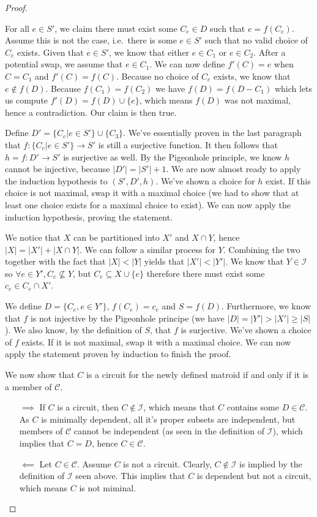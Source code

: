 \begin{proof}
\begin{enumerate}
\begin{enumerate}
            For all $e \in S'$, we claim there must exist some $C_e \in D$ such that $e = f(C_e)$. Assume this is not the case, i.e.\ there is some $e \in S'$ such that no valid choice of $C_e$ exists. Given that $e \in S'$, we know that either $e \in C_1$ or $e \in C_2$. After a potential swap, we assume that $e \in C_1$. We can now define $f'(C) = e$ when $C = C_1$ and $f'(C) = f(C)$. Because no choice of $C_e$ exists, we know that $e \not\in f(D)$. Because $f(C _1 ) = f(C _2 )$ we have $f(D) = f(D - C _1 )$ which lets us compute $f'(D) = f(D) \cup \{e\}$, which means $f(D)$ was not maximal, hence a contradiction. Our claim is then true.

            Define $D' = \{C_e | e \in S'\} \cup \{C _3 \}$. We've essentially proven in the last paragraph that $f : \{C_e | e \in S'\} \to S'$ is still a  surjective function. It then follows that $h = f : D' \to S'$ is surjective as well. By the Pigeonhole principle, we know $h$ cannot be injective, because $|D'| = |S'| + 1$. We are now almost ready to apply the induction hypothesis to $(S', D', h)$. We've shown a choice for $h$ exist. If this choice is not maximal, swap it with a maximal choice (we had to show that at least one choice exists for a maximal choice to exist). We can now apply the induction hypothesis, proving the statement.
    \end{enumerate}

    We notice that $X$ can be partitioned into $X'$ and $X \cap Y$, hence $|X| = |X'| + |X \cap Y|$. We can follow a similar process for $Y$. Combining the two together with the fact that $|X| < |Y|$ yields that $|X'| < |Y'|$. We know that $Y \in \mathcal I$ so $\forall e \in Y', C_e \not \subseteq  Y$, but $C_e \subseteq  X \cup \{e\}$ therefore there must exist some $c_e \in C_e \cap X'$. 

    We define $D = \{C_e, e \in Y'\}$, $f(C_e) = c_e$ and $S = f(D)$. Furthermore, we know that $f$ is not injective by the Pigeonhole principe (we have $|D| = |Y'| > |X'| \geq |S|$). We also know, by the definition of $S$, that $f$ is surjective. We've shown a choice of $f$ exists. If it is not maximal, swap it with a maximal choice. We can now apply the statement proven by induction to finish the proof.
\end{enumerate}


We now show that $C$ is a circuit for the newly defined matroid if and only if it is a member of $\mathcal C$. 
\begin{enumerate}
  \item[$\implies$]
  If $C$ is a circuit, then $C \not\in \mathcal I$, which means that $C$ contains some $D \in \mathcal C$. As $C$ is minimally dependent, all it's proper subsets are independent, but members of $\mathcal C$ cannot be independent (as seen in the definition of $\mathcal I$), which implies that $C = D$, hence $C \in \mathcal C$.
  \item[$\impliedby$]
  Let $C \in \mathcal C$. Assume $C$ is not a circuit. Clearly, $C \not\in \mathcal I$ is implied by the definition of $\mathcal I$ seen above. This implies that $C$ is dependent but not a circuit, which means $C$ is not miminal. 


\end{enumerate}
\end{proof}
